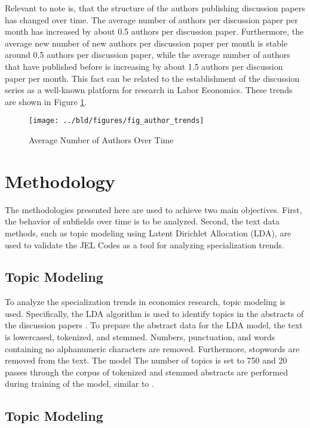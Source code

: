 \documentclass[11pt, a4paper, leqno]{article}
\begin{document}
Relevant to note is, that the structure of the authors publishing discussion papers has changed over time.
The average number of authors per discussion paper per month has increased by about 0.5 authors per discussion paper.
Furthermore, the average new number of new authors per discussion paper per month is stable around 0.5 authors per discussion paper, while the average number of authors that have published before is increasing by about 1.5 authors per discussion paper per month.
This fact can be related to the establishment of the discussion series as a well-known platform for research in Labor Economics.
These trends are shown in Figure \ref{fig:author_trends}.

\begin{figure}
    \centering
    \texttt{[image: ../bld/figures/fig\_author\_trends]}
    \caption{Average Number of Authors Over Time}
    \label{fig:author_trends}
\end{figure}

\section{Methodology}
The methodologies presented here are used to achieve two main objectives.
First, the behavior of subfields over time is to be analyzed.
Second, the text data methods, such as topic modeling using Latent Dirichlet Allocation (LDA), are used to validate the JEL Codes as a tool for analyzing specialization trends.

\subsection{Topic Modeling}
To analyze the specialization trends in economics research, topic modeling is used.
Specifically, the LDA algorithm is used to identify topics in the abstracts of the discussion papers \cite{blei2003}.
To prepare the abstract data for the LDA model, the text is lowercased, tokenized, and stemmed.
Numbers, punctuation, and words containing no alphanumeric characters are removed.
Furthermore, stopwords are removed from the text.
The model
The number of topics is set to 750 and 20 passes through the corpus of tokenized and stemmed abstracts are performed during training of the model, similar to \cite{galiani2023a}.

\subsection{Topic Modeling}
\end{document}
